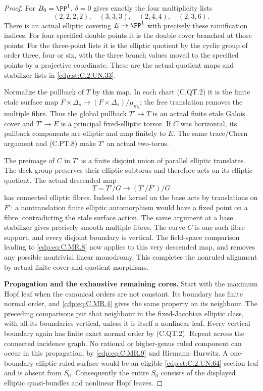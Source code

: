 \begin{proof}
For $B_0=\PP^1$, $\delta=0$ gives
exactly the four multiplicity lists
\[
       (2,2,2,2),\quad(3,3,3),\quad
                       (2,4,4),\quad(2,3,6).
\tag{C.MR.13}\label{cdp:eq:C.MR.13}
\]
There is an actual elliptic covering
$E\to\PP^1$ with precisely these
ramification indices. For four
specified double points it is the
double cover branched at those
points. For the three-point lists
it is the elliptic quotient by
the cyclic group of order three,
four or six, with the three
branch values moved to the
specified points by a projective
coordinate. These are the actual
quotient maps and stabilizer lists
in \ref{cdp:st:C.2.UN.33}.

Normalize the pullback of $T$ by
this map. In each chart (C.QT.2)
it is the finite etale surface
map $F\times\Delta_s\to
(F\times\Delta_s)/\mu_{m_i}$;
the free translation removes
the multiple fibre. Thus the
global pullback $T'\to T$ is
an actual finite etale Galois
cover and $T'\to E$ is a
principal fixed-elliptic torsor.
If $C$ was horizontal, its
pullback components are elliptic
and map finitely to $E$.
The same trace/Chern argument
and (C.PT.8) make $T'$ an
actual two-torus.

The preimage of $C$ in $T'$ is
a finite disjoint union of
parallel elliptic translates.
The deck group preserves their
elliptic subtorus and therefore
acts on its elliptic quotient.
The actual descended map
\[
 T=T'/G\longrightarrow
                  (T'/F')/G
\tag{C.MR.14}\label{cdp:eq:C.MR.14}
\]
has connected elliptic fibres.
Indeed the kernel on the base
acts by translations on $F'$:
a nontranslation finite elliptic
automorphism would have a fixed
point on a fibre, contradicting
the etale surface action.
The same argument at a base
stabilizer gives precisely
smooth multiple fibres.
The curve $C$ is one such
fibre support, and every
disjoint boundary is vertical.
The field-space comparison
leading to \eqref{cdp:eq:C.MR.8} now applies
to this very descended map,
and removes any possible
nontrivial linear monodromy.
This completes the nonruled
alignment by actual finite
cover and quotient morphisms.

\par\medskip\noindent\textbf{Propagation and the exhaustive remaining cores.}
Start with the maximum Hopf
leaf when the canonical orders
are not constant. Its boundary
has finite normal order, and
\eqref{cdp:eq:C.MR.4} gives the same property
on its neighbour. The preceding
comparisons put that neighbour
in the fixed-Jacobian elliptic
class, with all its boundaries
vertical, unless it is itself
a nonlinear leaf. Every vertical
boundary again has finite exact
normal order by (C.QT.2).
Repeat across the connected
incidence graph. No rational
or higher-genus ruled component
can occur in this propagation,
by \eqref{cdp:eq:C.MR.9} and
Riemann--Hurwitz. A one-boundary
elliptic ruled surface would be
an eligible \ref{cdp:st:C.2.UN.64} section leaf
and is absent from $S_0$.
Consequently the entire $S_0$
consists of the displayed
elliptic quasi-bundles and
nonlinear Hopf leaves.


\end{proof}
